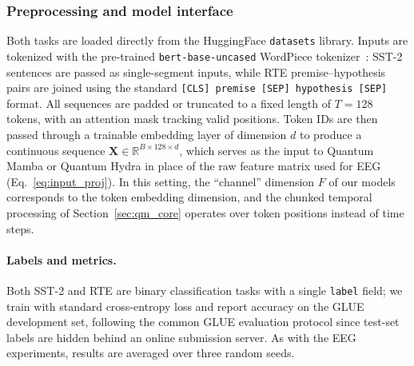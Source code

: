 \subsubsection{Preprocessing and model interface}
\label{sec:glue_preproc}

Both tasks are loaded directly from the HuggingFace \texttt{datasets} library.
Inputs are tokenized with the pre-trained \texttt{bert-base-uncased} WordPiece tokenizer~\cite{devlin2019bert}: SST-2 sentences are passed as single-segment inputs, while RTE premise--hypothesis pairs are joined using the standard \texttt{[CLS]\,premise\,[SEP]\,hypothesis\,[SEP]} format.
All sequences are padded or truncated to a fixed length of $T = 128$ tokens, with an attention mask tracking valid positions.
Token IDs are then passed through a trainable embedding layer of dimension $d$ to produce a continuous sequence $\mathbf{X} \in \mathbb{R}^{B \times 128 \times d}$, which serves as the input to Quantum Mamba or Quantum Hydra in place of the raw feature matrix used for EEG (Eq.~\eqref{eq:input_proj}).
In this setting, the ``channel'' dimension $F$ of our models corresponds to the token embedding dimension, and the chunked temporal processing of Section~\ref{sec:qm_core} operates over token positions instead of time steps.

\paragraph{Labels and metrics.}
Both SST-2 and RTE are binary classification tasks with a single \texttt{label} field; we train with standard cross-entropy loss and report accuracy on the GLUE development set, following the common GLUE evaluation protocol since test-set labels are hidden behind an online submission server.
As with the EEG experiments, results are averaged over three random seeds.
